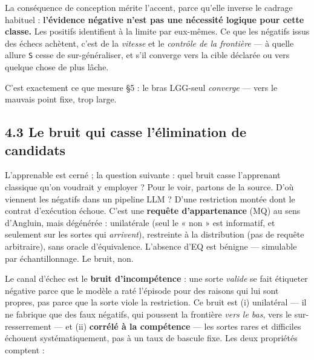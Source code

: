 \documentclass[11pt]{article}
\begin{document}
La conséquence de conception mérite l'accent, parce qu'elle inverse le cadrage habituel : \textbf{l'évidence négative n'est pas une nécessité logique pour cette classe.} Les positifs identifient à la limite par eux-mêmes. Ce que les négatifs issus des échecs achètent, c'est de la \emph{vitesse} et le \emph{contrôle de la frontière} — à quelle allure \texttt{S} cesse de sur-généraliser, et s'il converge vers la cible déclarée ou vers quelque chose de plus lâche.

C'est exactement ce que mesure §5 : le bras LGG-seul \emph{converge} — vers le mauvais point fixe, trop large.

\subsection*{4.3 Le bruit qui casse l'élimination de candidats}

L'apprenable est cerné ; la question suivante : quel bruit casse l'apprenant classique qu'on voudrait y employer ? Pour le voir, partons de la source. D'où viennent les négatifs dans un pipeline LLM ? D'une restriction montée dont le contrat d'exécution échoue. C'est une \textbf{requête d'appartenance} (MQ) au sens d'Angluin, mais dégénérée : unilatérale (seul le « non » est informatif, et seulement sur les sortes qui \emph{arrivent}), restreinte à la distribution (pas de requête arbitraire), sans oracle d'équivalence. L'absence d'EQ est bénigne — simulable par échantillonnage. Le bruit, non.

Le canal d'échec est le \textbf{bruit d'incompétence} : une sorte \emph{valide} se fait étiqueter négative parce que le modèle a raté l'épisode pour des raisons qui lui sont propres, pas parce que la sorte viole la restriction. Ce bruit est (i) unilatéral — il ne fabrique que des faux négatifs, qui poussent la frontière \emph{vers le bas}, vers le sur-resserrement — et (ii) \textbf{corrélé à la compétence} — les sortes rares et difficiles échouent systématiquement, pas à un taux de bascule fixe. Les deux propriétés comptent :
\end{document}
